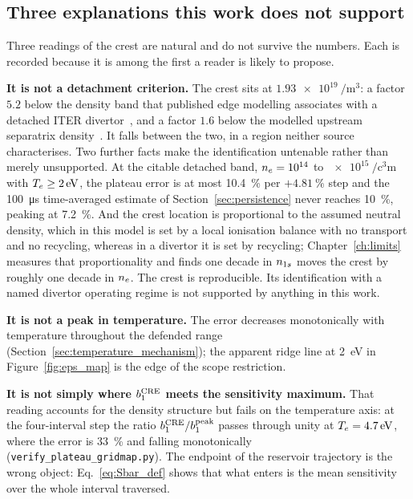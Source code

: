 \subsection{Three explanations this work does not support}
\label{sec:withdrawn}

Three readings of the crest are natural and do not survive the numbers. Each is
recorded because it is among the first a reader is likely to propose.

\textbf{It is not a detachment criterion.} The crest sits at
$\SI{1.93e19}{\per\cubic\metre}$: a factor $5.2$ below the density band that
published edge modelling associates with a detached ITER
divertor~\cite{Guillemaut2011}, and a factor $1.6$ below the modelled upstream
separatrix density~\cite{Stangeby2023}. It falls between the two, in a region
neither source characterises. Two further facts make the identification
untenable rather than merely unsupported. At the citable detached band,
$n_e = 10^{14}$ to $\SI{e15}{\per\cubic\centi\metre}$ with
$T_e\ge\SI{2}{\electronvolt}$, the plateau error is at most \SI{10.4}{\percent}
per $+\SI{4.81}{\percent}$ step and the \SI{100}{\micro\second} time-averaged
estimate of Section~\ref{sec:persistence} never reaches \SI{10}{\percent}, peaking at
\SI{7.2}{\percent}. And the crest location is proportional to the assumed
neutral density, which in this model is set by a local ionisation balance with
no transport and no recycling, whereas in a divertor it is set by recycling;
Chapter~\ref{ch:limits} measures that proportionality and finds one decade in
$n_{1s}$ moves the crest by roughly one decade in $n_e$. The crest is
reproducible. Its identification with a named divertor operating regime is not
supported by anything in this work.

\textbf{It is not a peak in temperature.} The error decreases monotonically with
temperature throughout the defended range (Section~\ref{sec:temperature_mechanism});
the apparent ridge line at \SI{2}{\electronvolt} in Figure~\ref{fig:eps_map} is
the edge of the scope restriction.

\textbf{It is not simply where $b_1^{\mathrm{CRE}}$ meets the sensitivity
maximum.} That reading accounts for the density structure but fails on the
temperature axis: at the four-interval step the ratio
$b_1^{\mathrm{CRE}}/b_1^{\mathrm{peak}}$ passes through unity at
$T_e = \SI{4.7}{\electronvolt}$, where the error is \SI{33}{\percent} and
falling monotonically (\texttt{verify\_plateau\_gridmap.py}). The endpoint of
the reservoir trajectory is the wrong object: Eq.~\eqref{eq:Sbar_def} shows
that what enters is the mean sensitivity over the whole interval traversed.

